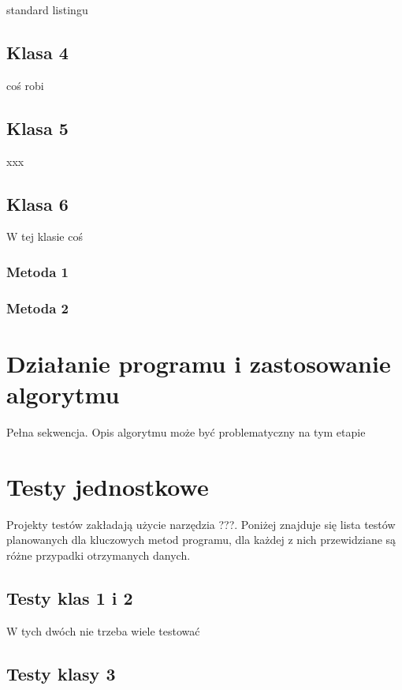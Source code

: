 \documentclass[a4paper,11pt]{article}
\newcommand\tab[1][0.6cm]{\hspace*{#1}}
\begin{document}
\tab standard listingu

\subsection{Klasa 4}

\tab coś robi


\subsection{Klasa 5}

\tab xxx

\subsection{Klasa 6}

\tab W tej klasie coś

\subsubsection{Metoda 1}



\subsubsection{Metoda 2}



\section{Działanie programu i zastosowanie algorytmu}

\tab Pełna sekwencja. Opis algorytmu może być problematyczny na tym etapie

\section{Testy jednostkowe}

\tab Projekty testów zakładają użycie narzędzia ???. Poniżej znajduje się lista testów planowanych dla kluczowych metod programu, dla każdej z nich przewidziane są różne przypadki otrzymanych danych. 

\subsection{Testy klas 1 i 2}

\tab W tych dwóch nie trzeba wiele testować

\subsection{Testy klasy 3}
\end{document}
